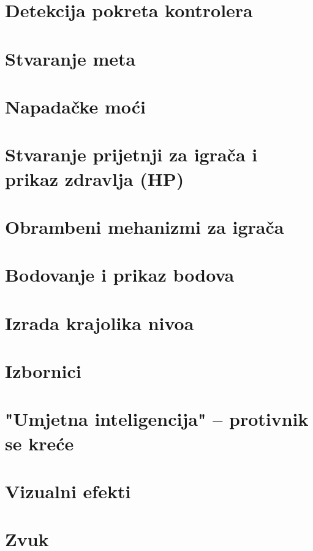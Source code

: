 \documentclass[a4paper,10pt]{article}
\begin{document}
\pagebreak
\section{Detekcija pokreta kontrolera}

\pagebreak
\section{Stvaranje meta}

\pagebreak
\section{Napadačke moći}

\pagebreak
\section{Stvaranje prijetnji za igrača i prikaz zdravlja (HP)}

\pagebreak
\section{Obrambeni mehanizmi za igrača}

\pagebreak
\section{Bodovanje i prikaz bodova}

\pagebreak
\section{Izrada krajolika nivoa}

\pagebreak
\section{Izbornici}

\pagebreak
\section{"Umjetna inteligencija" -- protivnik se kreće}

\pagebreak
\section{Vizualni efekti}

\pagebreak
\section{Zvuk}

\printindex
\end{document}
